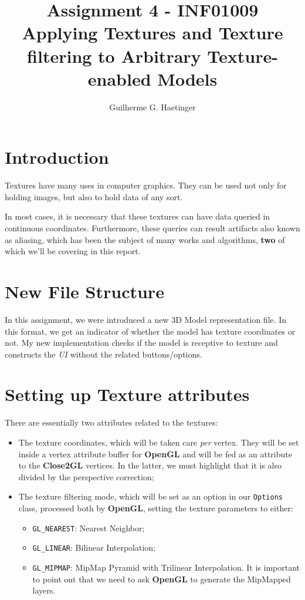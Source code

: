 \documentclass[twocolumn, 12pt]{article}
\author{Guilherme G. Haetinger}
\date{2021-10-21  \hl}
\title{Assignment 4 - INF01009  \\ Applying Textures and Texture filtering to Arbitrary Texture-enabled Models}
\begin{document}
\maketitle


\section{Introduction}
\label{sec:org0ecb256}

Textures have many uses in computer graphics. They can be used not
only for holding images, but also to hold data of any sort.

In most cases, it is necessary that these textures can have
data queried in continuous coordinates. Furthermore, these queries
can result artifacts also known as aliasing, which has been the
subject of many works and algorithms, \textbf{two} of which we'll be covering
in this report.

\section{New File Structure}
\label{sec:org7414bf4}

In this assignment, we were introduced a new 3D Model representation
file. In this format, we get an indicator of whether the model has
texture coordinates or not. My new implementation checks if the
model is receptive to texture and constructs the \emph{UI} without the
related buttons/options.

\section{Setting up Texture attributes}
\label{sec:org4299d73}

There are essentially two attributes related to the textures:
\begin{itemize}
\item The texture coordinates, which will be taken care \emph{per}
vertex. They will be set inside a vertex attribute buffer for
\textbf{OpenGL} and will be fed as an attribute to the \textbf{Close2GL}
vertices. In the latter, we must highlight that it is also divided
by the perspective correction;

\item The texture filtering mode, which will be set as an option in our
\texttt{Options} class, processed both by \textbf{OpenGL}, setting the texture
parameters to either:
\begin{itemize}
\item \texttt{GL\_NEAREST}: Nearest Neighbor;
\item \texttt{GL\_LINEAR}: Bilinear Interpolation;
\item \texttt{GL\_MIPMAP}: MipMap Pyramid with Trilinear Interpolation. It is
important to point out that we need to ask \textbf{OpenGL} to generate
the MipMapped layers.
\end{itemize}
\end{itemize}
\end{document}

